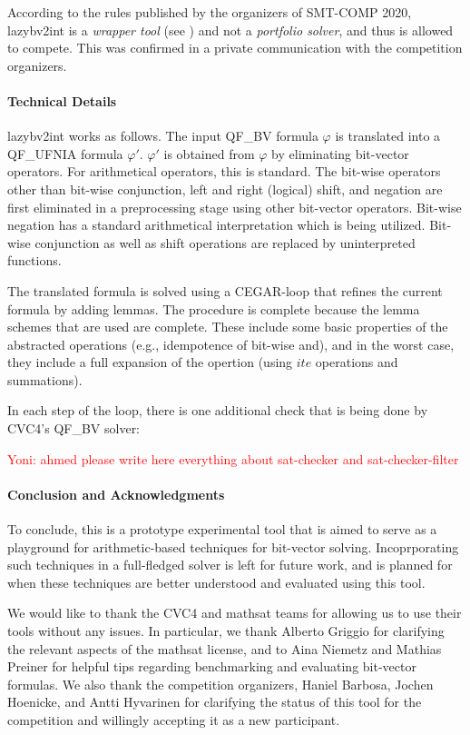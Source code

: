 \documentclass{easychair}
\newcommand{\comment}[3]{\begin{mdframed}{{\textcolor{#1}{#2: #3}}}\end{mdframed}}
\newcommand{\yoni}[1]{\comment{red}{Yoni}{#1}}
\newcommand{\lazybvtoint}{lazybv2int\xspace}
\newcommand{\smtcomp}{SMT-COMP\xspace}
\newcommand{\qfbv}{QF\_BV\xspace}
\newcommand{\qfufnia}{QF\_UFNIA\xspace}
\newcommand{\msat}{mathsat\xspace}
\newcommand{\cvcfour}{CVC4\xspace}
\begin{document}
According to the rules published by the organizers
of \smtcomp 2020, \lazybvtoint is a {\em wrapper tool} (see \cite{rules20})
and not a {\em portfolio solver},
and thus is allowed to compete. 
This was confirmed in a private communication with the competition organizers.

\paragraph{Technical Details}
\lazybvtoint works as follows.
The input \qfbv formula $\varphi$ is translated into a
\qfufnia formula $\varphi'$.
$\varphi'$ is obtained from $\varphi$ by eliminating
bit-vector operators.
For arithmetical operators, this is standard.
The bit-wise operators other than bit-wise conjunction, left
and right (logical) shift, and negation are first
eliminated in a preprocessing stage using other bit-vector operators.
Bit-wise negation has a standard arithmetical interpretation which is being utilized.
Bit-wise conjunction as well as shift operations are replaced by uninterpreted functions.

The translated formula is solved using a CEGAR-loop that refines the current formula by adding lemmas.
The procedure is complete because the lemma schemes that are used are complete.
%
These include some basic properties of the abstracted operations
(e.g., idempotence of bit-wise and), and in the worst case,
they include a full expansion of the opertion (using 
$ite$ operations and summations).

In each step of the loop, there is one additional check that is being done by \cvcfour's \qfbv solver:
\yoni{ahmed please write here everything about sat-checker and sat-checker-filter}


\paragraph{Conclusion and Acknowledgments}
To conclude, this is a prototype experimental tool that is aimed 
to serve as a playground for arithmetic-based techniques
for bit-vector solving.
Incoprporating such techniques in a full-fledged solver is left for future work,
and is planned for when these techniques are better
understood and evaluated using this tool.

We would like to thank the \cvcfour and \msat teams for allowing us 
to use their tools without any issues.
In particular, we thank Alberto Griggio for clarifying 
the relevant aspects of the \msat license,
and to Aina Niemetz and Mathias Preiner for helpful tips
regarding benchmarking and evaluating bit-vector formulas.
We also thank the competition organizers,
Haniel Barbosa, Jochen Hoenicke, and 
Antti Hyvarinen for clarifying the status of this tool for the competition and willingly accepting it as a new participant.



  
  
\end{document}
